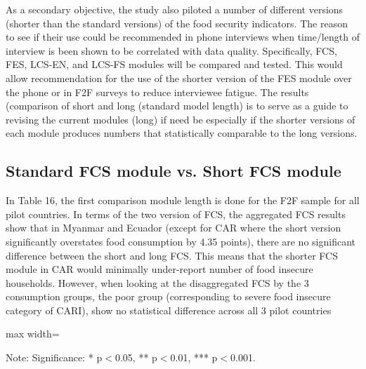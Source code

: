 \documentclass[11pt,harvard]{article}
\begin{document}
As a secondary objective, the study also piloted a number of different versions (shorter than the standard versions) of the food security indicators. The reason to see if their use could be recommended in phone interviews when time/length of interview is been shown to be correlated with data quality. Specifically, FCS, FES, LCS-EN, and LCS-FS modules will be compared and tested. This would allow recommendation for the use of the shorter version of the FES module over the phone or in F2F surveys to reduce interviewee fatigue. The results (comparison of short and long (standard model length) is to serve as a guide to revising the current modules (long) if need be especially if the shorter versions of each module produces numbers that statistically comparable to the long versions. 


\subsection{Standard FCS module vs. Short FCS module}

In Table 16, the first comparison module length is done for the F2F sample for all pilot countries. In terms of the two version of FCS, the aggregated FCS results show that in Myanmar and Ecuador (except for CAR where the short version significantly overstates food consumption by 4.35 points), there are no significant difference between the short and long FCS. This means that the shorter FCS module in CAR would minimally under-report number of food insecure households. 
However, when looking at the disaggregated FCS by the 3 consumption groups, the poor group (corresponding to severe food insecure category of CARI), show no statistical difference across all 3 pilot countries


\begin{table}[htbp]
	\centering
	\begin{adjustbox}{max width=\textwidth}
		\begin{threeparttable}
			\caption{Impact of Module Length on FCS Reporting}
			\scriptsize
			 
			\label{tab:FCS_F2F_Form_Length_All_Country}
			\begin{tablenotes}
				\item Note: Significance: * p$<$0.05, ** p$<$0.01, *** p$<$0.001. 
			\end{tablenotes}
		\end{threeparttable}
	\end{adjustbox}
\end{table}
\end{document}
